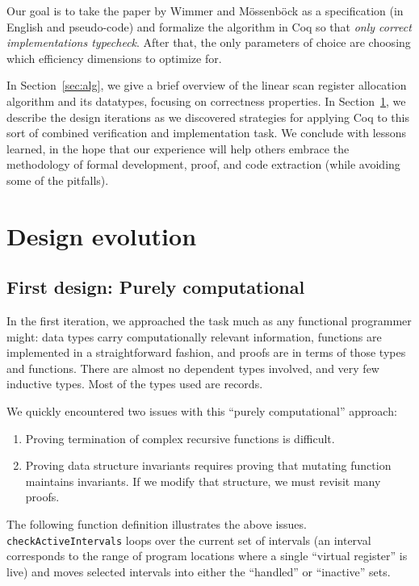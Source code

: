 \documentclass{llncs}
\newif\ifdraft\draftfalse  %
\newcommand{\comment}[3]{\ifdraft\textcolor{#1}{[#2: #3]}\else\fi}
\newcommand{\fixme}[1]{\comment{red}{FIXME}{#1}}
\newcommand{\todo}[1]{\comment{red}{TO DO}{#1}}
\begin{document}
Our goal is to take the paper by Wimmer and M\"{o}ssenb\"{o}ck as a
specification (in English and pseudo-code) and formalize the algorithm in Coq
so that \emph{only correct implementations typecheck}.  After that, the
only parameters of choice are choosing which efficiency dimensions to
optimize for.

\fixme{Rewrite section overview}In Section~\ref{sec:alg}, we give a
brief overview of the linear scan register allocation algorithm and
its datatypes, focusing on correctness properties. In
Section~\ref{sec:evolve}, we describe the design iterations as we
discovered strategies for applying Coq to this sort of combined
verification and implementation task.  We conclude with lessons
learned, in the hope that our experience will help others embrace the
methodology of formal development, proof, and code extraction (while
avoiding some of the pitfalls).

\todo{Add pointer to github repo containing all proofs and extracted
  Haskell (and maybe extended version of this paper).}


\section{Design evolution}
\label{sec:evolve}

\subsection{First design: Purely computational}
\label{sec:compdesign}

In the first iteration, we approached the task much as any functional
programmer might: data types carry computationally relevant
information, functions are implemented in a straightforward fashion,
and proofs are in terms of those types and functions.  There are
almost no dependent types involved, and very few inductive types.
Most of the types used are records.


We quickly encountered two issues with this ``purely computational''
approach:
\begin{enumerate}
\item Proving termination of complex recursive functions is difficult.
\item Proving data structure invariants requires proving that mutating
  function maintains invariants. If we modify that structure, we must revisit
  many proofs.
\end{enumerate}
The following function definition illustrates the above
issues. \texttt{checkActiveIntervals} loops over the current set of
intervals (an interval corresponds to the range of program locations
where a single ``virtual register'' is live) and moves selected
intervals into either the ``handled'' or ``inactive'' sets.
\end{document}
